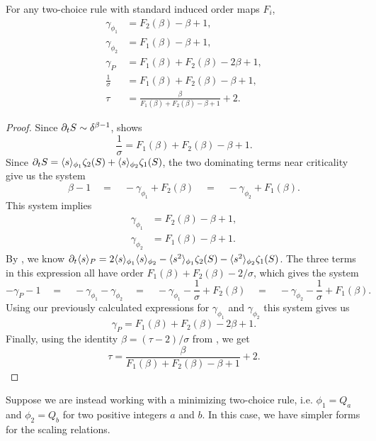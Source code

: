 \documentclass[twoside,10pt]{article}
\begin{document}
\begin{thrm}[]
	\label{2c-scaling-relations}
	For any two-choice rule with standard induced order maps $F_{i}$,
	\begin{align*}
		\gamma_{\phi_1} &= F_2(\beta) - \beta + 1,\\
		\gamma_{\phi_2} &= F_1(\beta) - \beta + 1,\\
		\gamma_{P} &= F_1(\beta)+F_2(\beta) - 2\beta + 1,\\
		\frac{1}{\sigma} &= F_1(\beta) + F_2(\beta) - \beta + 1,\\
		\tau &= \frac{\beta}{F_1(\beta)+F_2(\beta)-\beta+1} +2.
	\end{align*}
\end{thrm}
\begin{proof}
	Since $\partial_{t}{S} \sim \delta^{\beta-1}$,  shows
\[
	\frac{1}{\sigma} = F_1(\beta) + F_2(\beta) - \beta + 1.
\]
	Since $\partial_{t}{S} = \langle s \rangle_{\phi_1}\zeta_2(S) + \langle s \rangle_{\phi_2}\zeta_1(S)$, the two dominating terms near criticality give us the system
\[
        \beta -1 \quad=\quad -\gamma_{\phi_1} + F_2(\beta) \quad=\quad -\gamma_{\phi_2} + F_1(\beta).
\]
This system implies
\begin{align*}
        \gamma_{\phi_1} &= F_2(\beta) - \beta + 1,\\
        \gamma_{\phi_2} &= F_1(\beta) - \beta + 1.
\end{align*}
By , we know $\partial_{t}{\langle s \rangle_{P}} = 2\langle s \rangle_{\phi_1}\langle s \rangle_{\phi_2} - \langle s^2 \rangle_{\phi_1}\zeta_2(S) - \langle s^2 \rangle_{\phi_2}\zeta_1(S)$. The three terms in this expression all have order $F_1(\beta)+F_2(\beta) - 2/\sigma$, which gives the system
\[
        -\gamma_{P}-1 \quad=\quad -\gamma_{\phi_1}-\gamma_{\phi_2} \quad=\quad -\gamma_{\phi_1}-\frac{1}{\sigma} +F_2(\beta) \quad=\quad -\gamma_{\phi_2}-\frac{1}{\sigma} + F_1(\beta).
\]
Using our previously calculated expressions for $\gamma_{\phi_1}$ and $\gamma_{\phi_2}$ this system gives us
\[
        \gamma_{P} = F_1(\beta)+F_2(\beta) - 2\beta + 1.
\]
Finally, using the identity $\beta = (\tau-2)/\sigma$ from , we get
\[
        \tau = \frac{\beta}{F_1(\beta)+F_2(\beta)-\beta+1} +2.
\]
\end{proof}

Suppose we are instead working with a minimizing two-choice rule, i.e. $\phi_1=Q_{a}$ and $\phi_2=Q_{b}$ for two positive integers $a$ and $b$. In this case, we have simpler forms for the scaling relations.
\end{document}
